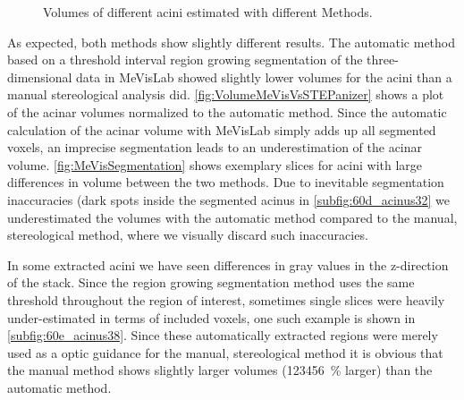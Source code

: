 \documentclass[%
	twoside,
	paper=a4,%
	abstract=true,%
	]{scrartcl}
\newcommand{\imsize}{\linewidth}
\newcommand{\difference}{123456}
\begin{document}
\begin{figure}[htb]
	\caption{Volumes of different acini estimated with different Methods.}
	\label{fig:VolumeMeVisVsSTEPanizer}%
\end{figure}

As expected, both methods show slightly different results. The automatic method based on a threshold interval region growing segmentation of the three-dimensional data in MeVisLab showed slightly lower volumes for the acini than a manual stereological analysis did. \autoref{fig:VolumeMeVisVsSTEPanizer} shows a plot of the acinar volumes normalized to the automatic method. Since the automatic calculation of the acinar volume with MeVisLab simply adds up all segmented voxels, an imprecise segmentation leads to an underestimation of the acinar volume. \autoref{fig:MeVisSegmentation} shows exemplary slices for acini with large differences in volume between the two methods. Due to inevitable segmentation inaccuracies (dark spots inside the segmented acinus in \autoref{subfig:60d_acinus32} we underestimated the volumes with the automatic method compared to the manual, stereological method, where we visually discard such inaccuracies.

In some extracted acini we have seen differences in gray values in the z-direction of the stack. Since the region growing segmentation method uses the same threshold throughout the region of interest, sometimes single slices were heavily under-estimated in terms of included voxels, one such example is shown in \autoref{subfig:60e_acinus38}. Since these automatically extracted regions were merely used as a optic guidance for the manual, stereological method it is obvious that the manual method shows slightly larger volumes (\SI{\difference}{\percent} larger) than the automatic method.
\end{document}
